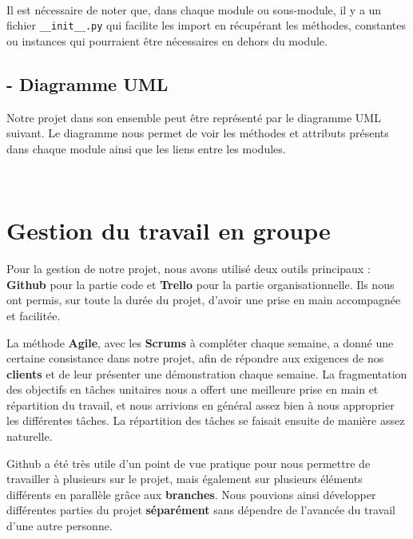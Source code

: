 \documentclass[12pt]{article}
\begin{document}
\\
Il est nécessaire de noter que, dans chaque module ou sous-module, il y a un fichier \texttt{\_\_init\_\_.py} qui facilite les import en récupérant les méthodes, constantes ou instances qui pourraient être nécessaires en dehors du module.

\subsection*{- Diagramme UML}
\hspace{\parindent}Notre projet dans son ensemble peut être représenté par le diagramme UML suivant. Le diagramme nous permet de voir les méthodes et attributs présents dans chaque module ainsi que les liens entre les modules. \\

\begin{landscape}

\end{landscape}
\\

\clearpage
\section*{Gestion du travail en groupe}

\hspace{\parindent}Pour la gestion de notre projet, nous avons utilisé deux outils principaux : \textbf{Github} pour la partie code et \textbf{Trello }pour la partie organisationnelle. Ils nous ont permis, sur toute la durée du projet, d’avoir une prise en main accompagnée et facilitée.

\hspace{\parindent}La méthode\textbf{ Agile}, avec les \textbf{Scrums} à compléter chaque semaine, a donné une certaine consistance dans notre projet, afin de répondre aux exigences de nos \textbf{clients} et de leur présenter une démonstration chaque semaine. La fragmentation des objectifs en tâches unitaires nous a offert une meilleure prise en main et répartition du travail, et nous arrivions en général assez bien à nous approprier les différentes tâches. La répartition des tâches se faisait ensuite de manière assez naturelle.

\hspace{\parindent} Github a été très utile d’un point de vue pratique pour nous permettre de travailler à plusieurs sur le projet, mais également sur plusieurs éléments différents en parallèle grâce aux \textbf{branches}. Nous pouvions ainsi développer différentes parties du projet \textbf{séparément} sans dépendre de l’avancée du travail d’une autre personne.
\end{document}
